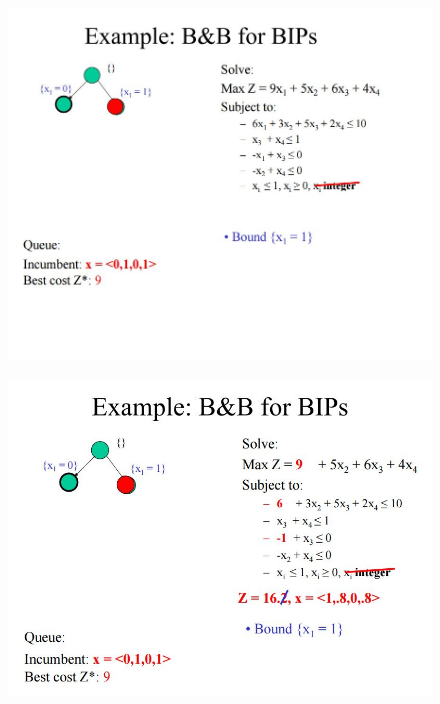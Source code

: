 \documentclass{beamer}
\begin{document}
\begin{frame}
	\begin{figure}
		\centering
		\includegraphics[width=1.0\linewidth]{BB-BIP/BB-BIP13}
	\end{figure}
\end{frame}
\begin{frame}
	\begin{figure}
		\centering
		\includegraphics[width=1.0\linewidth]{BB-BIP/BB-BIP14}
	\end{figure}
\end{frame}
\end{document}
